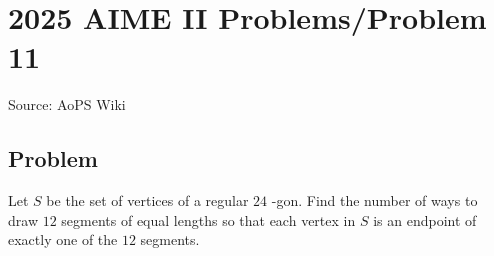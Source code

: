 \documentclass[12pt]{article}
\begin{document}
\section*{{2025 AIME II Problems/Problem 11}}
Source: AoPS Wiki

\subsection*{Problem}
Let $S$ be the set of vertices of a regular $24$ -gon. Find the number of ways to draw $12$ segments of equal lengths so that each vertex in $S$ is an endpoint of exactly one of the $12$ segments.
\end{document}
